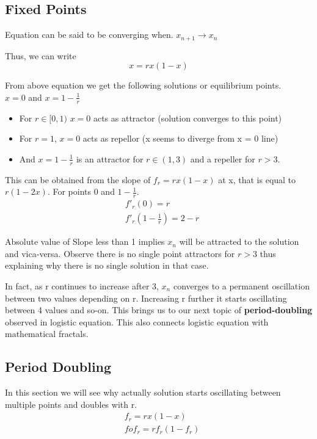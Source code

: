 \documentclass{report}
\begin{document}
\subsection{Fixed Points}

\raggedright

Equation can be said to be converging when. $x_{n+1} \to x_n$

Thus, we can write
\begin{equation}
    x = rx(1-x) \nonumber
\end{equation}

From above equation we get the following solutions or equilibrium points.\\

$x = 0$ and $x = 1 - \frac{1}{r}$
\begin{itemize}
  \item For $r \in [0,1)$ $x = 0$ acts as attractor (solution converges to this point)
  \item For $r = 1$, $x = 0$ acts as repellor (x seems to diverge from x = 0 line)
  \item And $x = 1 - \frac{1}{r}$ is an attractor for $r \in (1,3)$ and a repeller for $r > 3$.
\end{itemize}


This can be obtained from the slope of $f_r = rx(1-x)$ at x, \newline
that is equal to $r(1-2x)$. For points 0 and $1-\frac{1}{r}$.
\begin{align}
    &f'_r(0) = r  \nonumber \\
    &f'_r(1-\frac{1}{r}) = 2-r \nonumber
\end{align}

Absolute value of Slope less than 1 implies $x_n$ will be attracted to the solution and vica-versa. Observe there is no single point attractors for $r>3$ thus explaining why there is no single solution in that case.

In fact, as r continues to increase after 3, $x_n$ converges to a permanent oscillation between two values depending on r. Increasing r further it starts oscillating between 4 values and so-on. This brings us to our next topic of \textbf{period-doubling} observed in logistic equation. This also connects logistic equation with mathematical fractals.
\newpage
\subsection{Period Doubling}
\raggedright
In this section we will see why actually solution starts oscillating between multiple points and doubles with r.
\begin{align}
    &f_r = rx(1-x) \nonumber  \\
    &fof_r = rf_r(1-f_r) \nonumber
\end{align}
\end{document}
